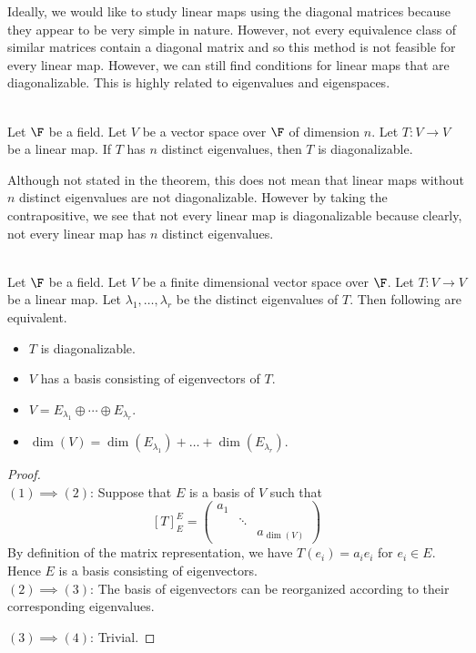 \documentclass[a4paper]{article}
\begin{document}
Ideally, we would like to study linear maps using the diagonal matrices because they appear to be very simple in nature. However, not every equivalence class of similar matrices contain a diagonal matrix and so this method is not feasible for every linear map. However, we can still find conditions for linear maps that are diagonalizable. This is highly related to eigenvalues and eigenspaces. 

\begin{prp}{}{}\\
Let $\F$ be a field. Let $V$ be a vector space over $\F$ of dimension $n$. Let $T:V\to V$ be a linear map. If $T$ has $n$ distinct eigenvalues, then $T$ is diagonalizable. 
\end{prp}

Although not stated in the theorem, this does not mean that linear maps without $n$ distinct eigenvalues are not diagonalizable. However by taking the contrapositive, we see that not every linear map is diagonalizable because clearly, not every linear map has $n$ distinct eigenvalues. 

\begin{prp}{}{}\\
Let $\F$ be a field. Let $V$ be a finite dimensional vector space over $\F$. Let $T:V\to V$ be a linear map. Let $\lambda_1,\dots,\lambda_r$ be the distinct eigenvalues of $T$. Then following are equivalent. 
\begin{itemize}
\item $T$ is diagonalizable. 
\item $V$ has a basis consisting of eigenvectors of $T$. 
\item $V=E_{\lambda_1}\oplus\cdots\oplus E_{\lambda_r}$. 
\item $\dim(V)=\dim(E_{\lambda_1})+\dots+\dim(E_{\lambda_r})$. 
\end{itemize}
\begin{proof}\\
$(1)\implies(2)$: Suppose that $E$ is a basis of $V$ such that $$[T]_E^E=\begin{pmatrix}
a_1 &&\\
&\ddots&\\
&&a_{\dim(V)}
\end{pmatrix}$$ By definition of the matrix representation, we have $T(e_i)=a_ie_i$ for $e_i\in E$. Hence $E$ is a basis consisting of eigenvectors. \\

$(2)\implies(3)$: The basis of eigenvectors can be reorganized according to their corresponding eigenvalues. 

$(3)\implies(4)$: Trivial.  
\end{proof}
\end{prp}
\end{document}
